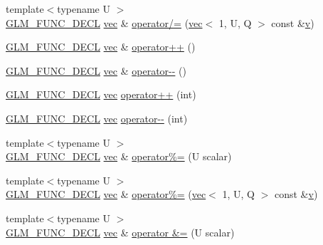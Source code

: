 \begin{DoxyCompactItemize}
\item 
{\footnotesize template$<$typename U $>$ }\\\hyperlink{setup_8hpp_ab2d052de21a70539923e9bcbf6e83a51}{G\+L\+M\+\_\+\+F\+U\+N\+C\+\_\+\+D\+E\+CL} \hyperlink{structglm_1_1vec}{vec} \& \hyperlink{structglm_1_1vec_3_011_00_01_t_00_01_q_01_4_a9ecfce3e3f712d4735f00bb4250d0f76}{operator/=} (\hyperlink{structglm_1_1vec}{vec}$<$ 1, U, Q $>$ const \&\hyperlink{_s_d_l__opengl_8h_a10a82eabcb59d2fcd74acee063775f90}{v})
\item 
\hyperlink{setup_8hpp_ab2d052de21a70539923e9bcbf6e83a51}{G\+L\+M\+\_\+\+F\+U\+N\+C\+\_\+\+D\+E\+CL} \hyperlink{structglm_1_1vec}{vec} \& \hyperlink{structglm_1_1vec_3_011_00_01_t_00_01_q_01_4_a987d92f70c9541002ae2b696f06947f0}{operator++} ()
\item 
\hyperlink{setup_8hpp_ab2d052de21a70539923e9bcbf6e83a51}{G\+L\+M\+\_\+\+F\+U\+N\+C\+\_\+\+D\+E\+CL} \hyperlink{structglm_1_1vec}{vec} \& \hyperlink{structglm_1_1vec_3_011_00_01_t_00_01_q_01_4_aeae2b05422c154000e72b90a08afdd13}{operator-\/-\/} ()
\item 
\hyperlink{setup_8hpp_ab2d052de21a70539923e9bcbf6e83a51}{G\+L\+M\+\_\+\+F\+U\+N\+C\+\_\+\+D\+E\+CL} \hyperlink{structglm_1_1vec}{vec} \hyperlink{structglm_1_1vec_3_011_00_01_t_00_01_q_01_4_aa829fdf00e136856718ce8c37b43d507}{operator++} (int)
\item 
\hyperlink{setup_8hpp_ab2d052de21a70539923e9bcbf6e83a51}{G\+L\+M\+\_\+\+F\+U\+N\+C\+\_\+\+D\+E\+CL} \hyperlink{structglm_1_1vec}{vec} \hyperlink{structglm_1_1vec_3_011_00_01_t_00_01_q_01_4_a5a8b3c0ef842a37c2ac49e9828231e6f}{operator-\/-\/} (int)
\item 
{\footnotesize template$<$typename U $>$ }\\\hyperlink{setup_8hpp_ab2d052de21a70539923e9bcbf6e83a51}{G\+L\+M\+\_\+\+F\+U\+N\+C\+\_\+\+D\+E\+CL} \hyperlink{structglm_1_1vec}{vec} \& \hyperlink{structglm_1_1vec_3_011_00_01_t_00_01_q_01_4_adfee0c8240cd43f82360a4a1910015f6}{operator\%=} (U scalar)
\item 
{\footnotesize template$<$typename U $>$ }\\\hyperlink{setup_8hpp_ab2d052de21a70539923e9bcbf6e83a51}{G\+L\+M\+\_\+\+F\+U\+N\+C\+\_\+\+D\+E\+CL} \hyperlink{structglm_1_1vec}{vec} \& \hyperlink{structglm_1_1vec_3_011_00_01_t_00_01_q_01_4_a9eb9bdb0ae02f791df5f5f5e50106a37}{operator\%=} (\hyperlink{structglm_1_1vec}{vec}$<$ 1, U, Q $>$ const \&\hyperlink{_s_d_l__opengl_8h_a10a82eabcb59d2fcd74acee063775f90}{v})
\item 
{\footnotesize template$<$typename U $>$ }\\\hyperlink{setup_8hpp_ab2d052de21a70539923e9bcbf6e83a51}{G\+L\+M\+\_\+\+F\+U\+N\+C\+\_\+\+D\+E\+CL} \hyperlink{structglm_1_1vec}{vec} \& \hyperlink{structglm_1_1vec_3_011_00_01_t_00_01_q_01_4_a706c89cad56f524dcb0f28ffd4331e47}{operator \&=} (U scalar)

\end{DoxyCompactItemize}

